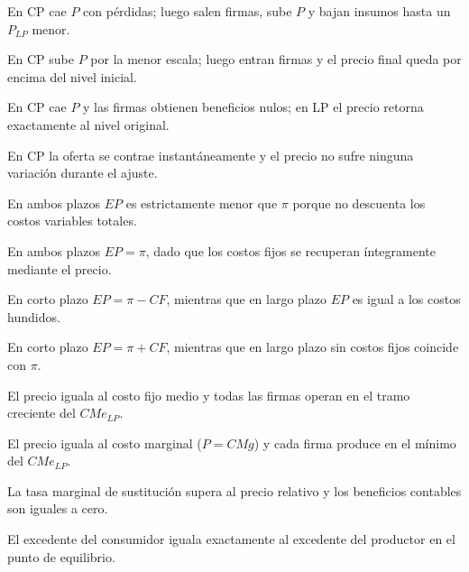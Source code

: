 \begin{opts}
    \item En CP cae $P$ con pérdidas; luego salen firmas, sube $P$ y bajan insumos hasta un $P_{LP}$ menor.
    \item En CP sube $P$ por la menor escala; luego entran firmas y el precio final queda por encima del nivel inicial.
    \item En CP cae $P$ y las firmas obtienen beneficios nulos; en LP el precio retorna exactamente al nivel original.
    \item En CP la oferta se contrae instantáneamente y el precio no sufre ninguna variación durante el ajuste.
\end{opts}

\begin{opts}
    \item En ambos plazos $EP$ es estrictamente menor que $\pi$ porque no descuenta los costos variables totales.
    \item En ambos plazos $EP = \pi$, dado que los costos fijos se recuperan íntegramente mediante el precio.
    \item En corto plazo $EP = \pi - CF$, mientras que en largo plazo $EP$ es igual a los costos hundidos.
    \item En corto plazo $EP = \pi + CF$, mientras que en largo plazo sin costos fijos coincide con $\pi$.
\end{opts}

\begin{opts}
    \item El precio iguala al costo fijo medio y todas las firmas operan en el tramo creciente del $CMe_{LP}$.
    \item El precio iguala al costo marginal ($P = CMg$) y cada firma produce en el mínimo del $CMe_{LP}$.
    \item La tasa marginal de sustitución supera al precio relativo y los beneficios contables son iguales a cero.
    \item El excedente del consumidor iguala exactamente al excedente del productor en el punto de equilibrio.
\end{opts}

